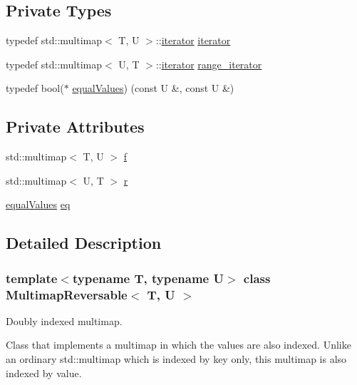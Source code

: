 \subsection*{Private Types}
\begin{DoxyCompactItemize}
\item 
typedef std\+::multimap$<$ T, U $>$\+::\hyperlink{classMultimapReversable_a4a255d95792e4ab19a4d903c27938156}{iterator} \hyperlink{classMultimapReversable_a4a255d95792e4ab19a4d903c27938156}{iterator}
\item 
typedef std\+::multimap$<$ U, T $>$\+::\hyperlink{classMultimapReversable_a4a255d95792e4ab19a4d903c27938156}{iterator} \hyperlink{classMultimapReversable_a206be6b005bde9b1a6d3abfa36ca370f}{range\+\_\+iterator}
\item 
typedef bool($\ast$ \hyperlink{classMultimapReversable_a73c1b30be5bb8d65b1bcfa5e0958a581}{equal\+Values}) (const U \&, const U \&)
\end{DoxyCompactItemize}
\subsection*{Private Attributes}
\begin{DoxyCompactItemize}
\item 
std\+::multimap$<$ T, U $>$ \hyperlink{classMultimapReversable_a35385c8878f1f1a749b99e3a788b2a9d}{f}
\item 
std\+::multimap$<$ U, T $>$ \hyperlink{classMultimapReversable_ae8f632be1baa742b2f72a69c49c34f2d}{r}
\item 
\hyperlink{classMultimapReversable_a73c1b30be5bb8d65b1bcfa5e0958a581}{equal\+Values} \hyperlink{classMultimapReversable_aca94996435f9aef6866914049a87c303}{eq}
\end{DoxyCompactItemize}


\subsection{Detailed Description}
\subsubsection*{template$<$typename T, typename U$>$\newline
class Multimap\+Reversable$<$ T, U $>$}

Doubly indexed multimap. 

Class that implements a multimap in which the values are also indexed. Unlike an ordinary std\+::multimap which is indexed by key only, this multimap is also indexed by value.

